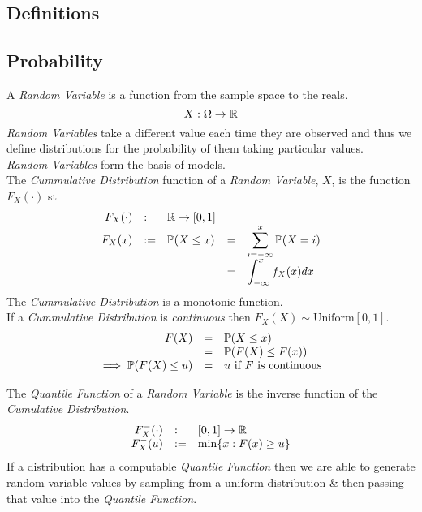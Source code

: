 \documentclass[11pt,a4paper]{article}
\begin{document}
\subsection{Definitions}





\subsection{Probability}

A \textit{Random Variable} is a function from the sample space to the reals.
$$X:\Omega\to\mathbb{R}$$
\textit{Random Variables} take a different value each time they are observed and thus we define distributions for the probability of them taking particular values.\\
\textit{Random Variables} form the basis of models.\\

The \textit{Cummulative Distribution} function of a \textit{Random Variable}, $X$, is the function $F_X(\cdot)$ st
\[\begin{array}{rllrl}
F_X(\cdot)&:&\mathbb{R}\to[0,1]\\
F_X(x)&:=&\mathbb{P}(X\leq x)&=&\displaystyle\sum_{i=-\infty}^x\mathbb{P}(X=i)\\
&&&=&\displaystyle\int_{-\infty}^xf_X(x)dx
\end{array}\]
The \textit{Cummulative Distribution} is a monotonic function.\\

If a \textit{Cummulative Distribution} is \textit{continuous} then $F_X(X)\sim\text{Uniform}[0,1]$.\\

\[\begin{array}{rcl}
F(X)&=&\mathbb{P}(X\leq x)\\
&=&\mathbb{P}(F(X)\leq F(x))\\
\implies\mathbb{P}(F(X)\leq u)&=&u\text{ if $F$ is continuous}
\end{array}\]

The \textit{Quantile Function} of a \textit{Random Variable} is the inverse function of the \textit{Cumulative Distribution}.\\
\[\begin{array}{rll}
F^-_X(\cdot)&:&[0,1]\to\mathbb{R}\\
F^-_X(u)&:=&\min\{x:F(x)\geq u\}
\end{array}\]
If a distribution has a computable \textit{Quantile Function} then we are able to generate random variable values by sampling from a uniform distribution \& then passing that value into the \textit{Quantile Function}.\\
\end{document}
